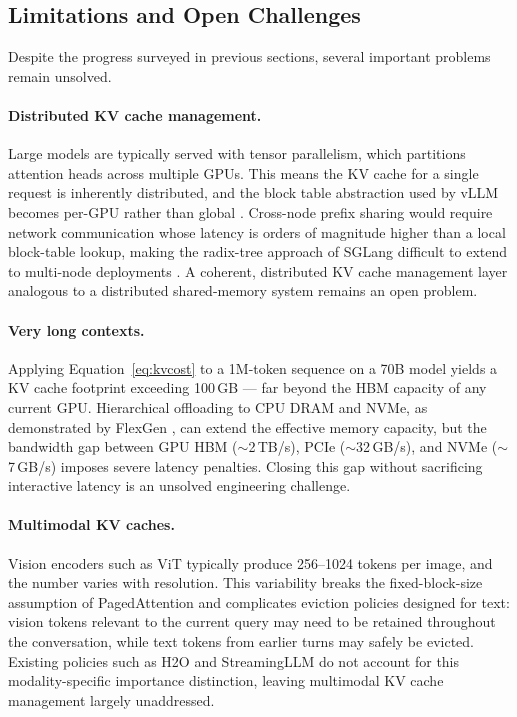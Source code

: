 \documentclass[10pt, a4paper]{article}
\begin{document}
\subsection{Limitations and Open Challenges}

Despite the progress surveyed in previous sections, several important
problems remain unsolved.

\paragraph{Distributed KV cache management.}
Large models are typically served with tensor parallelism, which
partitions attention heads across multiple GPUs.
This means the KV cache for a single request is inherently distributed,
and the block table abstraction used by vLLM becomes per-GPU rather
than global \cite{kwon2023vllm}.
Cross-node prefix sharing would require network communication whose
latency is orders of magnitude higher than a local block-table lookup,
making the radix-tree approach of SGLang difficult to extend to
multi-node deployments \cite{zheng2024sglang}.
A coherent, distributed KV cache management layer analogous to a
distributed shared-memory system remains an open problem.

\paragraph{Very long contexts.}
Applying Equation~\ref{eq:kvcost} to a 1M-token sequence on a 70B
model yields a KV cache footprint exceeding 100\,GB --- far beyond the
HBM capacity of any current GPU.
Hierarchical offloading to CPU DRAM and NVMe, as demonstrated by
FlexGen \cite{sheng2023flexgen}, can extend the effective memory
capacity, but the bandwidth gap between GPU HBM ($\sim$2\,TB/s), PCIe
($\sim$32\,GB/s), and NVMe ($\sim$7\,GB/s) imposes severe latency
penalties.
Closing this gap without sacrificing interactive latency is an
unsolved engineering challenge.

\paragraph{Multimodal KV caches.}
Vision encoders such as ViT typically produce 256--1024 tokens per
image, and the number varies with resolution.
This variability breaks the fixed-block-size assumption of PagedAttention
and complicates eviction policies designed for text: vision tokens
relevant to the current query may need to be retained throughout the
conversation, while text tokens from earlier turns may safely be evicted.
Existing policies such as H2O \cite{zhang2023h2o} and StreamingLLM
\cite{xiao2024streamingllm} do not account for this modality-specific
importance distinction, leaving multimodal KV cache management largely
unaddressed.
\end{document}
